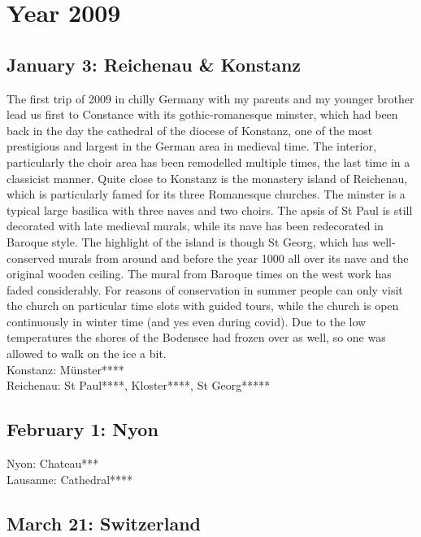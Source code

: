 \chapter{Year 2009}
\label{2009}

\section{January 3: Reichenau \& Konstanz}
\label{2009:Reichenau}

The first trip of 2009 in chilly Germany with my parents and my younger brother lead us first to Constance with its gothic-romanesque minster, which had been back in the day the cathedral of the diocese of Konstanz, one of the most prestigious and largest in the German area in medieval time. The interior, particularly the choir area has been remodelled multiple times, the last time in a classicist manner. Quite close to Konstanz is the monastery island of Reichenau, which is particularly famed for its three Romanesque churches. The minster is a typical large basilica with three naves and two choirs. The apsis of St Paul is still decorated with late medieval murals, while its nave has been redecorated in Baroque style. The highlight of the island is though St Georg, which has well-conserved murals from around and before the year 1000 all over its nave and the original wooden ceiling. The mural from Baroque times on the west work has faded considerably. For reasons of conservation in summer people can only visit the church on particular time slots with guided tours, while the church is open continuously in winter time (and yes even during covid). Due to the low temperatures the shores of the Bodensee had frozen over as well, so one was allowed to walk on the ice a bit.\\

Konstanz: M\"unster****\\
Reichenau: St Paul****, Kloster****, St Georg*****

\section{February 1: Nyon}
\label{2009:Nyon}

Nyon: Chateau***\\
Lausanne: Cathedral****

\section{March 21: Switzerland}
\label{2009:Switzerland}

